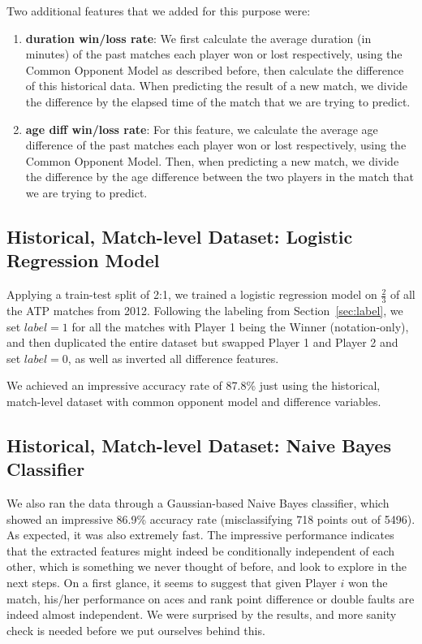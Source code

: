 \documentclass[paper=a4, fontsize=10pt]{scrartcl} %
\numberwithin{equation}{section} %
\numberwithin{figure}{section} %
\numberwithin{table}{section} %
\begin{document}
Two additional features that we added for this purpose were: \begin{enumerate}
\item \textbf{duration win/loss rate}: We first calculate the average duration (in minutes) of the past matches each player won or lost respectively, using the Common Opponent Model as described before, then calculate the difference of this historical data. When predicting the result of a new match, we divide the difference by the elapsed time of the match that we are trying to predict. 
\item \textbf{age diff win/loss rate}: For this feature, we calculate the average age difference of the past matches each player won or lost respectively, using the Common Opponent Model. Then, when predicting a new match, we divide the difference by the age difference between the two players in the match that we are trying to predict.
\end{enumerate}
\subsection{Historical, Match-level Dataset: Logistic Regression Model}
Applying a train-test split of 2:1, we trained a logistic regression model on $\frac{2}{3}$ of all the ATP matches from 2012. Following the labeling from Section~\ref{sec:label}, we set $label = 1$ for all the matches with Player 1 being the Winner (notation-only), and then duplicated the entire dataset but swapped Player 1 and Player 2 and set $label = 0$, as well as inverted all difference features.

We achieved an impressive accuracy rate of 87.8\% just using the historical, match-level dataset with common opponent model and difference variables. 

\subsection{Historical, Match-level Dataset: Naive Bayes Classifier}
We also ran the data through a Gaussian-based Naive Bayes classifier, which showed an impressive 86.9\% accuracy rate (misclassifying 718 points out of 5496). As expected, it was also extremely fast. The impressive performance indicates that the extracted features might indeed be conditionally independent of each other, which is something we never thought of before, and look to explore in the next steps. On a first glance, it seems to suggest that given Player $i$ won the match, his/her performance on aces and rank point difference or double faults are indeed almost independent. We were surprised by the results, and more sanity check is needed before we put ourselves behind this. 
\end{document}
